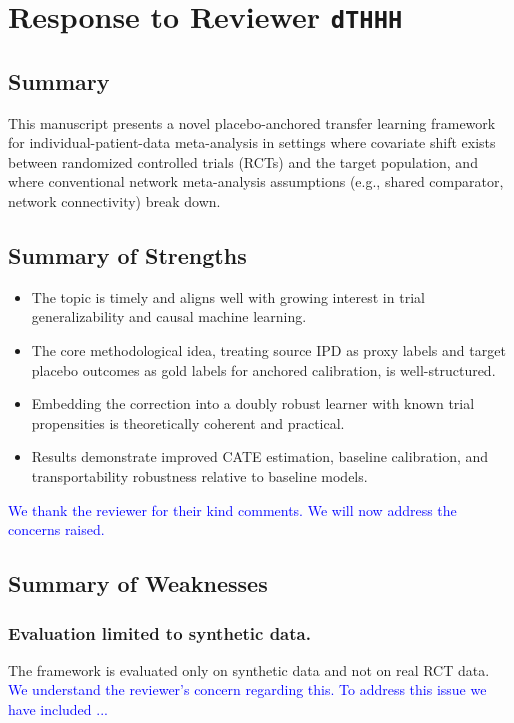 \section{Response to Reviewer \texttt{dTHHH}}

\subsection*{Summary}

This manuscript presents a novel placebo-anchored transfer learning framework for individual-patient-data meta-analysis in settings where covariate shift exists between randomized controlled trials (RCTs) and the target population, and where conventional network meta-analysis assumptions (e.g., shared comparator, network connectivity) break down.


\subsection*{Summary of Strengths}

\begin{itemize}
    \item The topic is timely and aligns well with growing interest in trial generalizability and causal machine learning.
    \item The core methodological idea, treating source IPD as proxy labels and target placebo outcomes as gold labels for anchored calibration, is well-structured.
    \item Embedding the correction into a doubly robust learner with known trial propensities is theoretically coherent and practical.
    \item Results demonstrate improved CATE estimation, baseline calibration, and transportability robustness relative to baseline models.
\end{itemize}

\noindent\textcolor{blue}{We thank the reviewer for their kind comments. We will now address the concerns raised.}

\subsection*{Summary of Weaknesses}


\subsubsection{Evaluation limited to synthetic data.}  
The framework is evaluated only on synthetic data and not on real RCT data.\\
\textcolor{blue}{We understand the reviewer's concern regarding this. To address this issue we have included ...}


